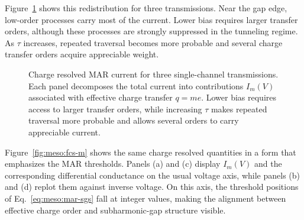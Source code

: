             Figure~\ref{fig:meso:fcs} shows this redistribution for three transmissions. Near the gap edge, low-order processes carry most of the current. Lower bias requires larger transfer orders, although these processes are strongly suppressed in the tunneling regime. As $\tau$ increases, repeated traversal becomes more probable and several charge transfer orders acquire appreciable weight.

            \begin{figure}[t]
                \centering
                \hfill
                \hfill
                \caption{
                    Charge resolved MAR current for three single-channel transmissions.
                    Each panel decomposes the total current into contributions $I_m(V)$ associated with effective charge transfer $q=me$.
                    Lower bias requires access to larger transfer orders, while increasing $\tau$ makes repeated traversal more probable and allows several orders to carry appreciable current.
                    }
                \label{fig:meso:fcs}
            \end{figure}

            Figure~\ref{fig:meso:fcs-m} shows the same charge resolved quantities in a form that emphasizes the MAR thresholds. Panels (a) and (c) display $I_m(V)$ and the corresponding differential conductance on the usual voltage axis, while panels (b) and (d) replot them against inverse voltage. On this axis, the threshold positions of Eq.~\eqref{eq:meso:mar-sgs} fall at integer values, making the alignment between effective charge order and subharmonic-gap structure visible.

